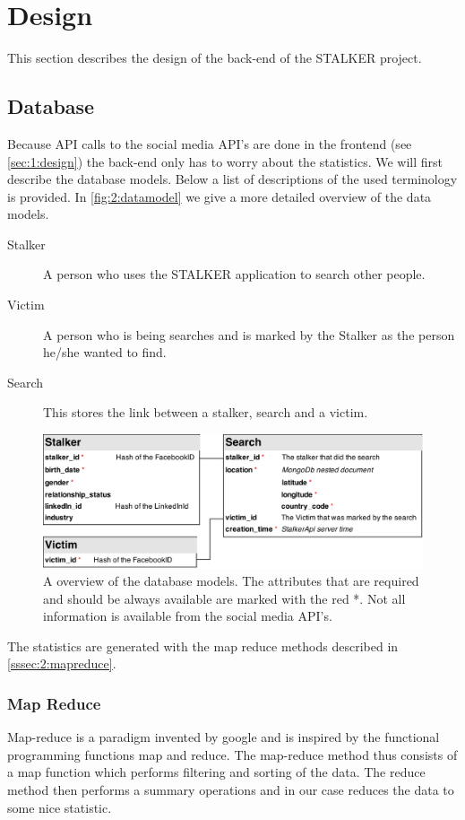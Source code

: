 \section{Design}

This section describes the design of the back-end of the STALKER project. 

\subsection{Database}
Because API calls to the social media API's are done in the frontend (see \autoref{sec:1:design}) the back-end only has to worry about the statistics. We will first describe the database models. Below a list of descriptions of the used terminology is provided. In \autoref{fig:2:datamodel} we give a more detailed overview of the data models.

\begin{description}
\item[Stalker] A person who uses the STALKER application to search other people.
\item[Victim] A person who is being searches and is marked by the Stalker as the person he/she wanted to find.
\item[Search] This stores the link between a stalker, search and a victim.
\end{description}

\begin{figure}
    \includegraphics[width=\textwidth]{./img/database_models}   
    \caption{A overview of the database models. The attributes that are required and should be always available are marked with the red *. Not all information is available from the social media API's.}
    \label{fig:2:datamodel}
\end{figure}

The statistics are generated with the map reduce methods described in \autoref{sssec:2:mapreduce}.

\subsubsection{Map Reduce}
\label{sssec:2:mapreduce}
Map-reduce is a paradigm invented by google and is inspired by the functional programming functions map and reduce. The map-reduce method thus consists of a map function which performs filtering and sorting of the data. The reduce method then performs a summary operations and in our case reduces the data to some nice statistic. 

